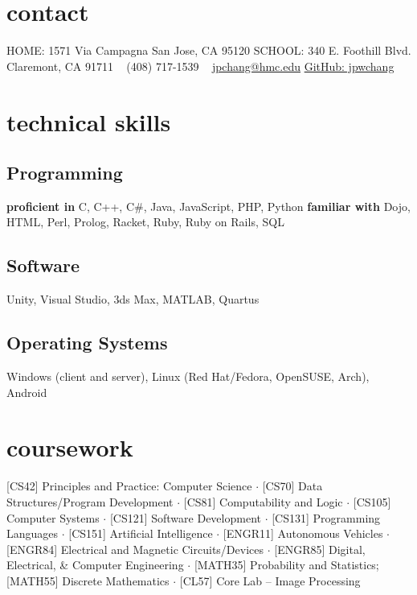 \documentclass[print]{friggeri-cv} %
\begin{document}


\begin{aside} %
\section{contact}
HOME:
1571 Via Campagna
San Jose, CA 95120
SCHOOL:
340 E. Foothill Blvd.
Claremont, CA 91711
~
(408) 717-1539
~
\href{mailto:jpchang@hmc.edu}{jpchang@hmc.edu}
\href{https://github.com/jpwchang}{GitHub: jpwchang}
\section{technical skills} 
\subsection{Programming}
\textbf{proficient in}
C, C++, C\#, Java, JavaScript, PHP, Python
\textbf{familiar with}
Dojo, HTML, Perl, Prolog, Racket, Ruby, Ruby on Rails, SQL
\subsection{Software}
Unity, Visual Studio, 3ds Max, MATLAB, Quartus
\subsection{Operating Systems}
Windows (client and server), Linux (Red Hat/Fedora, OpenSUSE, Arch), Android
\end{aside}

\section{coursework}

[CS42] Principles and Practice: Computer Science $\cdot$ [CS70] Data Structures/Program Development $\cdot$ [CS81]
Computability and Logic $\cdot$ [CS105] Computer Systems $\cdot$ [CS121] Software Development $\cdot$ [CS131] Programming
Languages $\cdot$ [CS151] Artificial Intelligence $\cdot$ [ENGR11] Autonomous Vehicles $\cdot$ [ENGR84] Electrical and Magnetic
Circuits/Devices $\cdot$ [ENGR85] Digital, Electrical, \& Computer Engineering $\cdot$ [MATH35] Probability and Statistics;
[MATH55] Discrete Mathematics $\cdot$ [CL57] Core Lab – Image Processing
\end{document}

